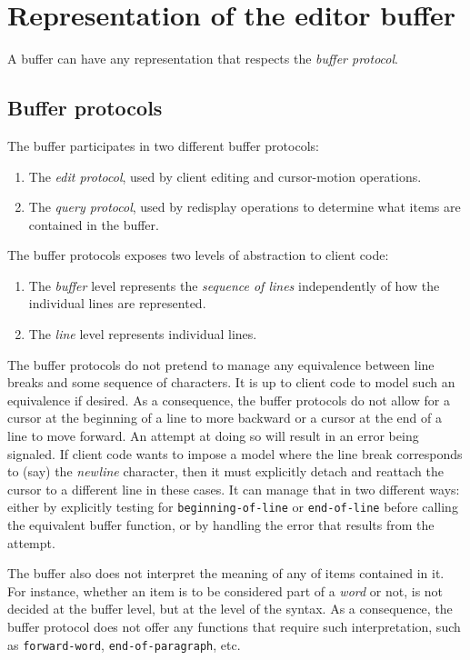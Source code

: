 \chapter{Representation of the editor buffer}
\label{chap-internals-buffer}

A buffer can have any representation that respects the \emph{buffer
  protocol}.

\section{Buffer protocols}

The buffer participates in two different buffer protocols:

\begin{enumerate}
\item The \emph{edit protocol}, used by client editing and
  cursor-motion operations.
\item The \emph{query protocol}, used by redisplay operations to
  determine what items are contained in the buffer. 
\end{enumerate}

The buffer protocols exposes two levels of abstraction to client code: 

\begin{enumerate}
\item The \emph{buffer} level represents the \emph{sequence of lines}
  independently of how the individual lines are represented.  
\item The \emph{line} level represents individual lines. 
\end{enumerate}

The buffer protocols do not pretend to manage any equivalence between
line breaks and some sequence of characters.  It is up to client code
to model such an equivalence if desired.  As a consequence, the buffer
protocols do not allow for a cursor at the beginning of a line to
more backward or a cursor at the end of a line to move forward.  An
attempt at doing so will result in an error being signaled.  If client
code wants to impose a model where the line break corresponds to (say)
the \emph{newline} character, then it must explicitly detach and
reattach the cursor to a different line in these cases.  It can manage
that in two different ways: either by explicitly testing for
\texttt{beginning-of-line} or \texttt{end-of-line} before calling the
equivalent buffer function, or by handling the error that results from
the attempt. 

The buffer also does not interpret the meaning of any of items
contained in it.  For instance, whether an item is to be considered
part of a \emph{word} or not, is not decided at the buffer level, but
at the level of the syntax.  As a consequence, the buffer protocol
does not offer any functions that require such interpretation, such as
\texttt{forward-word}, \texttt{end-of-paragraph}, etc. 

